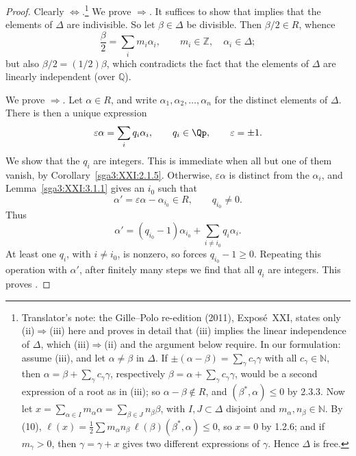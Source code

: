 \begin{proof}
Clearly \(\Leftrightarrow\).\footnote{Translator's note: the Gille--Polo re-edition (2011), Exposé~XXI, states
only (ii)\(\Rightarrow\)(iii) here and proves in detail that (iii) implies the linear
independence of \(\Delta\), which (iii)\(\Rightarrow\)(ii) and the argument below
require. In our formulation: assume (iii), and let \(\alpha\neq\beta\) in \(\Delta\). If
\(\pm(\alpha-\beta)=\sum_\gamma c_\gamma\gamma\) with all \(c_\gamma\in\mathbb N\), then
\(\alpha=\beta+\sum_\gamma c_\gamma\gamma\), respectively
\(\beta=\alpha+\sum_\gamma c_\gamma\gamma\), would be a second expression of a root as
in (iii); so \(\alpha-\beta\notin R\), and \((\beta^\ast,\alpha)\leq0\) by 2.3.3. Now
let \(x=\sum_{\alpha\in I}m_\alpha\alpha=\sum_{\beta\in J}n_\beta\beta\), with
\(I,J\subset\Delta\) disjoint and \(m_\alpha,n_\beta\in\mathbb N\). By (10),
\(\ell(x)=\frac12\sum m_\alpha n_\beta\,\ell(\beta)(\beta^\ast,\alpha)\leq0\), so
\(x=0\) by 1.2.6; and if \(m_\gamma>0\), then \(\gamma=\gamma+x\) gives two different
expressions of \(\gamma\). Hence \(\Delta\) is free.} We prove
\(\Rightarrow\). It suffices to show that  implies
that the elements of \(\Delta\) are indivisible. So let \(\beta\in\Delta\) be
divisible. Then \(\beta/2\in R\), whence
\[
 \frac{\beta}{2}=\sum_i m_i\alpha_i,
 \qquad m_i\in\mathbb Z,\quad\alpha_i\in\Delta;
\]
but also \(\beta/2=(1/2)\beta\), which contradicts the fact that the
elements of \(\Delta\) are linearly independent (over \(\mathbb Q\)).

We prove \(\Rightarrow\). Let \(\alpha\in R\), and write
\(\alpha_1,\alpha_2,\ldots,\alpha_n\) for the distinct elements of
\(\Delta\). There is then a unique expression
\[
 \varepsilon\alpha=\sum_i q_i\alpha_i,
 \qquad q_i\in\Qp,\qquad\varepsilon=\pm1.
\]
We show that the \(q_i\) are integers. This is immediate when all but
one of them vanish, by Corollary~\ref{sga3:XXI:2.1.5}. Otherwise,
\(\varepsilon\alpha\) is distinct from the \(\alpha_i\), and
Lemma~\ref{sga3:XXI:3.1.1} gives an \(i_0\) such that
\[
 \alpha'=\varepsilon\alpha-\alpha_{i_0}\in R,
 \qquad q_{i_0}\neq0.
\]
Thus
\[
 \alpha'
 =(q_{i_0}-1)\alpha_{i_0}
  +\sum_{i\neq i_0}q_i\alpha_i.
\]
At least one \(q_i\), with \(i\neq i_0\), is nonzero, so  forces
\(q_{i_0}-1\geq0\). Repeating this operation with \(\alpha'\), after
finitely many steps we find that all \(q_i\) are integers. This proves
.
\end{proof}


